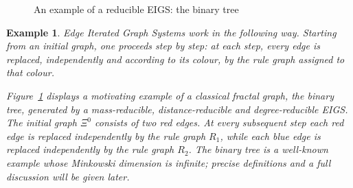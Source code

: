 \documentclass[12pt]{iopart}
\newtheorem{example}[theorem]{Example}
\begin{document}
\begin{figure}[ht]
    \caption{An example of a reducible EIGS: the binary tree}
    \label{fig:binary_tree}
\end{figure}

\begin{example}
Edge Iterated Graph Systems work in the following way. 
Starting from an initial graph, one proceeds step by step: 
at each step, every edge is replaced, independently and according to its colour, 
by the rule graph assigned to that colour. 

Figure~\ref{fig:binary_tree} displays a motivating example of a classical fractal { graph}, the binary tree, generated by a { mass-reducible, distance-reducible and degree-reducible EIGS}. 
The initial graph $\Xi^0$ consists of two red edges. 
At every subsequent step each red edge is replaced independently by the rule graph $R_1$, 
while each blue edge is replaced independently by the rule graph $R_2$. 
The binary tree is a well-known example whose Minkowski dimension is infinite; 
precise definitions and a full discussion will be given later.
\end{example}
\end{document}
